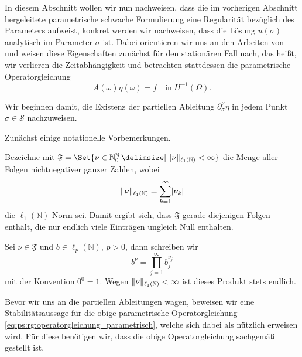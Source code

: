 In diesem Abschnitt wollen wir nun nachweisen, dass die im vorherigen Abschnitt hergeleitete parametrische schwache Formulierung eine Regularität bezüglich des Parameters aufweist, konkret werden wir nachweisen, dass die Lösung $u(\sigma)$ analytisch im Parameter $\sigma$ ist.
Dabei orientieren wir uns an den Arbeiten von \textcite{Cohen:2010kz,Kunoth:2013ef} und weisen diese Eigenschaften zunächst für den stationären Fall nach, das heißt, wir verlieren die Zeitabhängigkeit und betrachten stattdessen die parametrische Operatorgleichung
\begin{equation}
\label{eq:ps:rg:operatorgleichung_parametrisch}
    A(\omega) \eta(\omega) = f \quad \text{in}~H^{-1}(\Omega).
\end{equation}

Wir beginnen damit, die Existenz der partiellen Ableitung $\partial^{\nu}_{\sigma} \eta$ in jedem Punkt $\sigma \in \mathcal S$ nachzuweisen.

Zunächst einige notationelle Vorbemerkungen.
\begin{Bemerkung}
    Bezeichne mit $\mathfrak F = \Set{ \nu \in \mathbb{N}^{\mathbb{N}}_{0} \given \norm{\nu}_{\ell_{1}(\mathbb{N})} < \infty }$ die Menge aller Folgen nichtnegativer ganzer Zahlen, wobei
    \begin{equation}
        \lVert\nu\rVert_{\ell_{1}(\mathbb{N})} = \sum_{k = 1}^{\infty} \lvert\nu_{k}\rvert
    \end{equation}
    die $\ell_{1}(\mathbb{N})$-Norm sei.
    Damit ergibt sich, dass $\mathfrak F$ gerade diejenigen Folgen enthält, die nur endlich viele Einträgen ungleich Null enthalten.

    Sei $\nu \in \mathfrak F$ und $b \in \ell_{p}(\mathbb{N})$, $p > 0$, dann schreiben wir
    \begin{equation}
        b^{\nu} = \prod_{j = 1}^{\infty} b_{j}^{\nu_{j}}
    \end{equation}
    mit der Konvention $0^{0} = 1$.
    Wegen $\lVert\nu\rVert_{\ell_{1}(\mathbb{N})} < \infty$ ist dieses Produkt stets endlich.
\end{Bemerkung}

Bevor wir uns an die partiellen Ableitungen wagen, beweisen wir eine Stabilitätsaussage für die obige parametrische Operatorgleichung \cref{eq:ps:rg:operatorgleichung_parametrisch}, welche sich dabei als nützlich erweisen wird.
Für diese benötigen wir, dass die obige Operatorgleichung sachgemäß gestellt ist.

